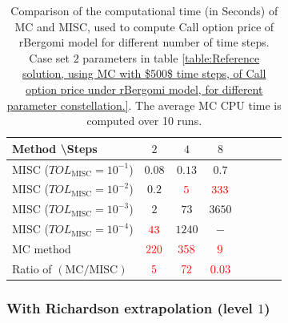 \begin{table}[htbp]
	\centering
	\begin{tabular}{l*{6}{c}r}
		Method \textbackslash  Steps            & $2$ & $4$ & $8$   \\
		\hline
		MISC ($TOL_{\text{MISC}}=10^{-1}$)  & $0.08$ & $0.13$ & $0.7$   \\
		MISC ($TOL_{\text{MISC}}=10^{-2}$)  & $0.2$& ${\color{red}5}$ & ${\color{red}333}$   \\
		MISC ($TOL_{\text{MISC}}=10^{-3}$)  &  $2$ & $73$ & $3650$  \\		
		MISC ($TOL_{\text{MISC}}=10^{-4}$)  & ${\color{red}43}$ & $1240$ & $-$  \\	
	
		\hline
		MC method & ${\color{red}220}$  & ${\color{red}358}$  & ${\color{red}9}$  \\
		\hline	
		Ratio of $\left(\text{MC}/ \text{MISC} \right)$  &${\color{red}5}$ & ${\color{red}   72 
		}$  & ${\color{red}  0.03	}$   \\
		\hline
	\end{tabular}
	\caption{Comparison of the computational time (in Seconds) of  MC and MISC, used to compute Call option price of rBergomi model for different number of time steps. Case  set $2$ parameters in table \ref{table:Reference solution, using MC with $500$ time steps, of Call option price under rBergomi model, for different parameter constellation.}. The
		average MC CPU time is computed over 10 runs.}
	\label{Comparsion of the computational time of  MC and MISC, used to compute Call option price of rBergomi model for different number of time steps. Case $K=1, H=0.07$, linear}
\end{table}
\FloatBarrier
\subsubsection*{With Richardson extrapolation (level $1$)}

